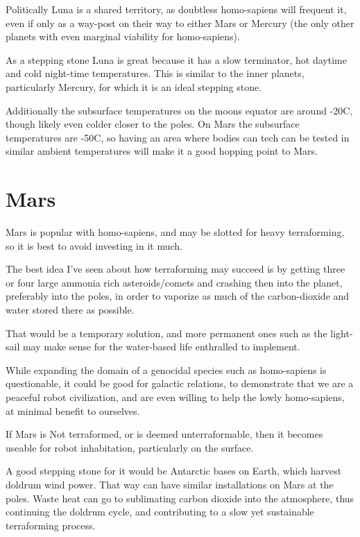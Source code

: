 Politically Luna is a shared territory, as doubtless homo-sapiens will frequent
it, even if only as a way-post on their way to either Mars or Mercury (the only
other planets with even marginal viability for homo-sapiens). 

As a stepping stone Luna is great because it has a slow terminator, hot daytime
and cold night-time temperatures. This is similar to the inner planets,
particularly Mercury, for which it is an ideal stepping stone. 

Additionally the subsurface temperatures on the moons equator are around -20C, 
though likely even colder closer to the poles.  On Mars the subsurface
temperatures are -50C, so having an area where bodies can tech can be tested in
similar ambient temperatures will make it a good hopping point to Mars.


\section{Mars}

Mars is popular with homo-sapiens, and may be slotted for heavy terraforming,
 so it is best to avoid investing in it much. 

The best idea I've seen about how terraforming may succeed is by getting three
or four large ammonia rich asteroids/comets and crashing then into the planet,
preferably into the poles, in order to vaporize as much of the carbon-dioxide
and water stored there as possible. 

That would be a temporary solution, and more permanent ones such as
the light-sail may make sense for the water-based life enthralled to implement. 

While expanding the domain of a genocidal species such as homo-sapiens is
questionable, it could be good for galactic relations, to demonstrate that we
are a peaceful robot civilization, and are even willing to help the lowly
homo-sapiens, at minimal benefit to ourselves. 

If Mars is Not terraformed, or is deemed unterraformable, then it becomes
useable for robot inhabitation, particularly on the surface. 

A good stepping stone for it would be Antarctic bases on Earth, which harvest
doldrum wind power. That way can have similar installations on Mars at the
poles. Waste heat can go to sublimating carbon dioxide into the atmosphere, thus
continuing the doldrum cycle, and contributing to a slow yet sustainable 
terraforming process. 

